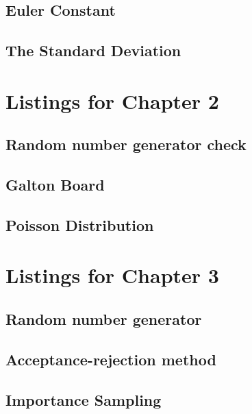\subsection{Euler Constant}


\subsection{The Standard Deviation}


\section{Listings for Chapter 2}

\subsection{Random number generator check}



\subsection{Galton Board}


\subsection{Poisson Distribution}


\section{Listings for Chapter 3}

\subsection{Random number generator}


\subsection{Acceptance-rejection method}


\subsection{Importance Sampling}


